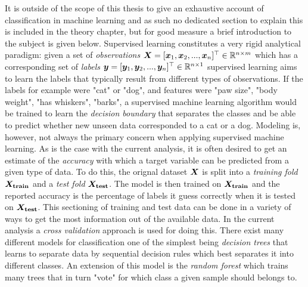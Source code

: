It is outside of the scope of this thesis to give an exhaustive account of classification in machine learning and as such no dedicated section to explain this is included in the theory chapter, but for good measure a brief introduction to the subject is given below. Supervised learning constitutes a very rigid analytical paradigm: given a set of \textit{observations} $\bm{X} = [\bm{x}_1, \bm{x}_2, ..., \bm{x}_n]^\top \in \mathbb{R}^{n \times m}$ which has a corresponding set of \textit{labels} $\bm{y} = [\bm{y}_1, \bm{y}_2, ..., \bm{y}_n]^\top \in \mathbb{R}^{n \times 1}$ supervised learning aims to learn the labels that typically result from different types of observations. If the labels for example were "cat" or "dog", and features were "paw size", "body weight", "has whiskers", "barks", a supervised machine learning algorithm would be trained to learn the \textit{decision boundary} that separates the classes and be able to predict whether new unseen data corresponded to a cat or a dog. Modeling is, however, not always the primary concern when applying supervised machine learning. As is the case with the current analysis, it is often desired to get an estimate of the \textit{accuracy} with which a target variable can be predicted from a given type of data. To do this, the orignal dataset $\bm{X}$ is split into a \textit{training fold} $\bm{X_\mathrm{train}}$ and a \textit{test fold} $\bm{X_\mathrm{test}}$. The model is then trained on $\bm{X_\mathrm{train}}$ and the reported accuracy is the percentage of labels it guess correctly when it is tested on $\bm{X_\mathrm{test}}$. This sectioning of training and test data can be done in a variety of ways to get the most information out of the available data. In the current analysis a \textit{cross validation} approach is used for doing this. There exist many different models for classification one of the simplest being \textit{decision trees} that learns to separate data by sequential decision rules which best separates it into different classes. An extension of this model is the \textit{random forest} which trains many trees that in turn "vote" for which class a given sample should belongs to.

